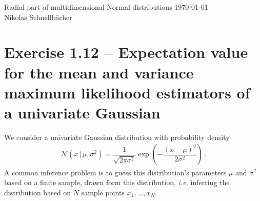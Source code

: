\documentclass[11pt, DINA4, fleqn]{amsart}
\begin{document}

\tikzset{node distance = 2cm, auto}



\begin{flushleft}
{\sc \Large Radial part of multidimensional Normal distributions} \hfill \today \\
\medskip
Nikolas Schnellbächer \underline{\hspace{6.53in}} \\
\end{flushleft}

\section*{Exercise 1.12 -- Expectation value for the mean and variance maximum likelihood estimators of a univariate Gaussian}
We consider a univariate Gaussian distribution with probability density
\begin{align}
\mathcal{N}\left(x \,\bigl| \, \mu, \sigma^2\right) = \dfrac{1}{\sqrt{2\pi \sigma^2}}\exp\left(-\dfrac{(x-\mu)^2}{2\sigma^2}\right) \, .
\end{align}
A common inference problem is to guess this distribution's parameters $\mu$ and $\sigma^2$ based on a finite sample, drawn form this distribution, \textit{i.e.}
inferring the distribution based on $N$ sample points $x_1, \dots, x_N$.
\end{document}
